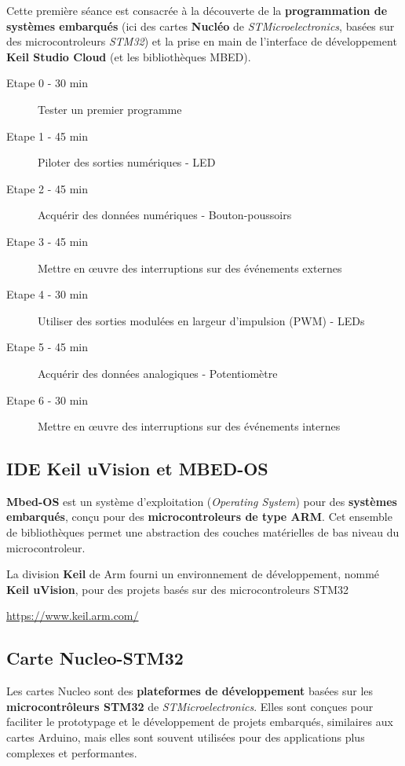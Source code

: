 \documentclass[a4paper,11pt,titlepage]{article} %
\begin{document}
Cette première séance est consacrée à la découverte de la \textbf{programmation de systèmes embarqués} (ici des cartes \textbf{Nucléo} de \textit{STMicroelectronics}, basées sur des microcontroleurs \textit{STM32}) et la prise en main de l'interface de développement \textbf{Keil Studio Cloud} (et les bibliothèques MBED).


	\begin{description}
		\item[Etape 0 - 30 min] Tester un premier programme
		\item[Etape 1 - 45 min] Piloter des sorties numériques - LED
		\item[Etape 2 - 45 min] Acquérir des données numériques - Bouton-poussoirs
		\item[Etape 3 - 45 min] Mettre en \oe{}uvre des interruptions sur des événements externes
		\item[Etape 4 - 30 min] Utiliser des sorties modulées en largeur d'impulsion (PWM) - LEDs
		\item[Etape 5 - 45 min] Acquérir des données analogiques - Potentiomètre
		\item[Etape 6 - 30 min] Mettre en \oe{}uvre des interruptions sur des événements internes
	\end{description}	


\subsection{IDE Keil uVision et MBED-OS}

\textbf{Mbed-OS} est un système d'exploitation (\textit{Operating System}) pour des \textbf{systèmes embarqués}, conçu pour des \textbf{microcontroleurs de type ARM}. Cet ensemble de bibliothèques permet une abstraction des couches matérielles de bas niveau du microcontroleur. 

La division \textbf{Keil} de Arm fourni un environnement de développement, nommé \textbf{Keil uVision}, pour des projets basés sur des microcontroleurs STM32

\href{https://www.keil.arm.com/}{https://www.keil.arm.com/}


\subsection{Carte Nucleo-STM32}

Les cartes Nucleo sont des \textbf{plateformes de développement} basées sur les \textbf{microcontrôleurs STM32} de \textit{STMicroelectronics}. Elles sont conçues pour faciliter le prototypage et le développement de projets embarqués, similaires aux cartes Arduino, mais elles sont souvent utilisées pour des applications plus complexes et performantes.
\end{document}
